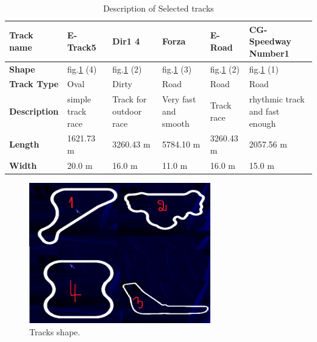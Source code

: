 \documentclass{llncs}
\begin{document}
\begin{table}[h!]
	
	\caption{Description of Selected tracks}
	\label{Tabtrack}
	\begin{tabular}{ |p{2cm}|p{2 cm}|p{2 cm}|p{2 cm}|p{2 cm}|p{2 cm}|}
		\hline
		\textbf{Track name}    & E-Track5
		& Dir1 4 
		& Forza
		& E-Road
		& CG-Speedway Number1
		\\
		\hline
		\textbf{Shape}   
		& fig.\ref{fig3} (4)
		& fig.\ref{fig3} (2)
		& fig.\ref{fig3} (3) 
		& fig.\ref{fig3} (2)
		& fig.\ref{fig3} (1)
		
		\\
		\hline
		\textbf{Track Type}   
		& Oval
		& Dirty
		& Road
		& Road
		& Road
		
		\\
		\hline
		\textbf{Description}   
		& simple track race
		
		& Track for outdoor race
		& Very fast and smooth
		& Track race
		& rhythmic track and fast enough
		
		\\
		\hline
		
		\textbf{Length}   
		& 1621.73 m
		& 3260.43 m
		& 5784.10 m
		& 3260.43 m
		& 2057.56 m
		
		\\
		\hline
		\textbf{Width}   
		& 20.0 m
		& 16.0 m
		& 11.0 m
		& 16.0 m
		& 15.0 m
		\\
		\hline
	\end{tabular} 
\end{table}
\begin{figure}[h!]
	
	\centering
	\includegraphics[width=0.7\textwidth]{fig/trackresultat.PNG}
	\begin{minipage}{10cm}
		\centering
		\caption{\footnotesize Tracks shape.}
		\label{fig3}
	\end{minipage} 
	
\end{figure}
\end{document}
